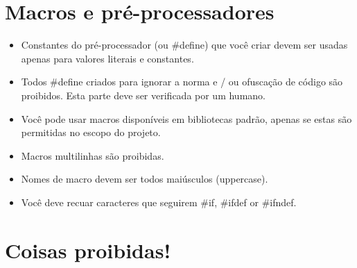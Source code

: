 \documentclass{42-pt}
\begin{document}
                
    \section{Macros e pré-processadores}

        \begin{itemize}

            \item Constantes do pré-processador (ou \#define) que você criar devem ser usadas
                apenas para valores literais e constantes.
            \item Todos \#define criados para ignorar a norma e / ou ofuscação de
                código são proibidos. Esta parte deve ser verificada por um humano.
            \item Você pode usar macros disponíveis em bibliotecas padrão, apenas
                se estas são permitidas no escopo do projeto.
            \item Macros multilinhas são proibidas.
            \item Nomes de macro devem ser todos maiúsculos (uppercase).
            \item Você deve recuar caracteres que seguirem \#if, \#ifdef
                or \#ifndef.

        \end{itemize}
        \newpage


    \section{Coisas proibidas!}
\end{document}
